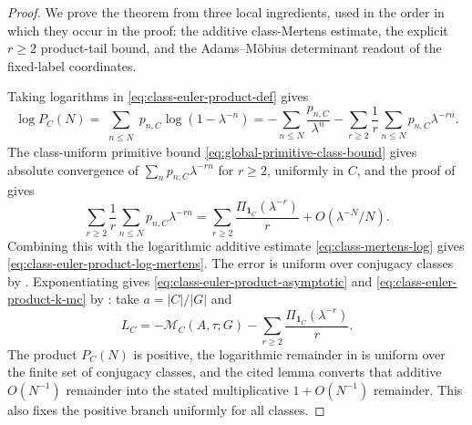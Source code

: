 \begin{proof}
  We prove the theorem from three local ingredients, used in the order in
  which they occur in the proof: the additive class-Mertens estimate,
  the explicit \(r\ge2\) product-tail bound, and the Adams--M\"obius
  determinant readout of the fixed-label coordinates.

  Taking logarithms in \eqref{eq:class-euler-product-def} gives
  \[
    \log P_C(N)
    =
    \sum_{\substack{n\le N}}
      p_{n,C}\log(1-\lambda^{-n})
    =
    -\sum_{n\le N}\frac{p_{n,C}}{\lambda^n}
      -
      \sum_{r\ge2}\frac{1}{r}
        \sum_{n\le N}p_{n,C}\lambda^{-rn}.
  \]
  The class-uniform primitive bound
  \eqref{eq:global-primitive-class-bound} gives absolute convergence of
  \(\sum_np_{n,C}\lambda^{-rn}\) for \(r\ge2\), uniformly in \(C\), and the
  proof of  gives
  \[
    \sum_{r\ge2}\frac{1}{r}\sum_{n\le N}p_{n,C}\lambda^{-rn}
    =
    \sum_{r\ge2}\frac{\Pi_{\mathbf1_C}(\lambda^{-r})}{r}
    +O(\lambda^{-N}/N).
  \]
  Combining this with the logarithmic additive estimate
  \eqref{eq:class-mertens-log} gives
  \eqref{eq:class-euler-product-log-mertens}.  The error is uniform over
  conjugacy classes by
  .
  Exponentiating gives \eqref{eq:class-euler-product-asymptotic} and
  \eqref{eq:class-euler-product-k-mc} by
  : take
  \(a=|C|/|G|\) and
  \[
    L_C=-\mathcal M_C(A,\tau;G)
    -\sum_{r\ge2}\frac{\Pi_{\mathbf1_C}(\lambda^{-r})}{r}.
  \]
  The product \(P_C(N)\) is positive, the logarithmic remainder in
   is uniform over the finite set of
  conjugacy classes, and the cited lemma converts that additive
  \(O(N^{-1})\) remainder into the stated multiplicative
  \(1+O(N^{-1})\) remainder.  This also fixes the positive branch uniformly for
  all classes.


\end{proof}
